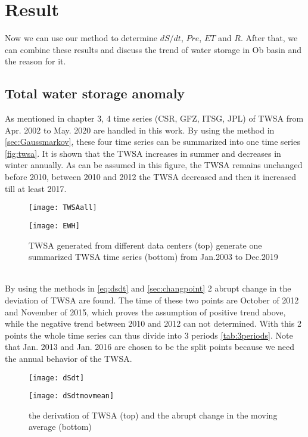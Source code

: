 \chapter{Result}
Now we can use our method to determine $dS/dt$, $Pre$, $ET$ and $R$. After that, we can combine these results and discuss the trend of water storage in Ob basin and the reason for it.
\section{Total water storage anomaly}
As mentioned in chapter 3, 4 time series (CSR, GFZ, ITSG, JPL) of TWSA from Apr. 2002 to May. 2020 are handled in this work. By using the method in \autoref{sec:Gaussmarkov}, these four time series can be summarized into one time series \autoref{fig:twsa}. It is shown that the TWSA increases in summer and decreases in winter annually. As can be assumed in this figure, the TWSA remains unchanged before 2010, between 2010 and 2012 the TWSA decreased and then it increased till at least 2017.   \\
\begin{figure}[htbp]\centering
	\begin{minipage}[t]{0.85\textwidth}
		\centering
		\texttt{[image: TWSAall]} %
	\end{minipage}
	\begin{minipage}[t]{0.85\textwidth}
		\centering
		\texttt{[image: EWH]} %
	\end{minipage}
	\caption{TWSA generated from different data centers (top) generate one summarized TWSA time series (bottom) from Jan.2003 to Dec.2019}
	\label{fig:twsa}
\end{figure}\\
By using the methods in \autoref{eq:dsdt} and \autoref{sec:changpoint} 2 abrupt change in the deviation of TWSA are found. The time of these two points are October of 2012 and November of 2015, which proves the assumption of positive trend above, while the negative trend between 2010 and 2012 can not determined. With this 2 points the whole time series can thus divide into 3 periods \autoref{tab:3periods}. Note that Jan. 2013 and Jan. 2016 are chosen to be the split points because we need the annual behavior of the TWSA. 
\begin{figure}[htbp]\centering
	\begin{minipage}[t]{0.7\textwidth}
		\centering
		\texttt{[image: dSdt]} %
	\end{minipage}
	\begin{minipage}[t]{0.7\textwidth}
		\centering
		\texttt{[image: dSdtmovmean]} %
	\end{minipage}
	\caption{the derivation of TWSA (top) and the abrupt change in the moving average (bottom)}
	\label{fig:dsdt}
\end{figure}
